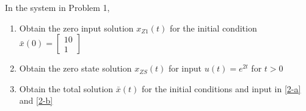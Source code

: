 \item In the system in Problem 1,
  \begin{enumerate}
  \item Obtain the zero input solution $x_{Z1}(t)$ for the initial condition
    $\bar x(0) = \begin{bmatrix}
10\\
1
\end{bmatrix}
$ \label{2-a}
    
  \item Obtain the zero state solution $x_{ZS}(t)$ for input $u(t) = e^{2t}$ for $t > 0$ \label{2-b}
  \item Obtain the total solution $\bar x(t)$ for the initial conditions and input in \ref{2-a} and
    \ref{2-b}
  \end{enumerate}